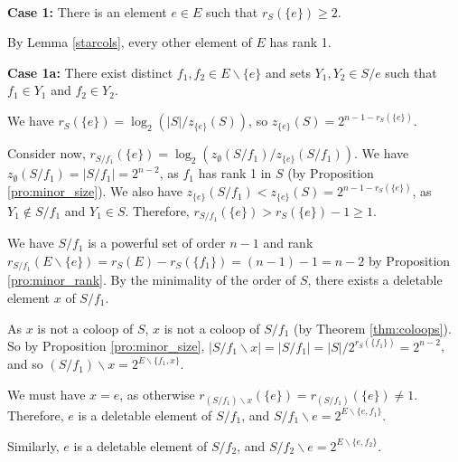 \documentclass[10pt]{article}
\theoremstyle{definition}
\begin{document}
~\\\noindent\textbf{Case 1:} There is an element $e\in E$ such that $r_S(\{e\})\geq 2$.

By Lemma \ref{starcols}, every other element of $E$ has rank 1. 


\textbf{Case 1a:} There exist distinct $f_1,f_2\in E\backslash \{e\}$ and sets $Y_1,Y_2 \in S/e$ such that $f_1\in Y_1$ and  $f_2\in Y_2$.
 

We have $r_S(\{e\})=\log_2(|S|/z_{\{e\}}(S))$, so $z_{\{e\}}(S)=2^{n-1-r_S(\{e\})}$.

Consider now, $r_{S/f_1}(\{e\})= \log_2(z_\emptyset(S/f_1)/z_{\{e\}}(S/f_1))$. We have $z_\emptyset (S/f_1)=|S/f_1|=2^{n-2}$, as $f_1$ has rank 1 in $S$ (by Proposition \ref{pro:minor_size}). We also have $z_{\{e\}}(S/f_1)<z_{\{e\}}(S)=2^{n-1-r_S(\{e\})}$, as $Y_1\notin S/f_1$ and $Y_1\in S$. Therefore, $r_{S/f_1}(\{e\})>r_S(\{e\})-1\geq 1$.

 
We have $S/f_1$ is a powerful set of order $n-1$ and rank $r_{S/f_1}(E\backslash\{e\})=r_S(E)-r_S(\{f_1\})=(n-1)-1=n-2$ by Proposition \ref{pro:minor_rank}. By the minimality of the order of $S$, there exists a deletable element $x$ of $S/f_1$.

As $x$ is not a coloop of $S$, $x$ is not a coloop of $S/f_1$  (by Theorem \ref{thm:coloops}). So by Proposition \ref{pro:minor_size}, $|S/f_1\backslash x|=|S/f_1|=|S|/ 2^{r_S(\{f_1\})}=2^{n-2}$, and so  $(S/f_1)\backslash x =2^{E\backslash\{f_1,x\}}$.

We must have $x=e$, as otherwise $r_{(S/f_1)\backslash x}(\{e\})=r_{(S/f_1)}(\{e\})\neq 1$.
Therefore, $e$ is a deletable element of $S/f_1$, and $S/f_1\backslash{e} = 2^{E\backslash{\{e,f_1\}}}$. 

Similarly, $e$ is a deletable element of $S/f_2$, and  $S/f_2\backslash{e} = 2^{E\backslash{\{e,f_2\}}}$.
\end{document}
